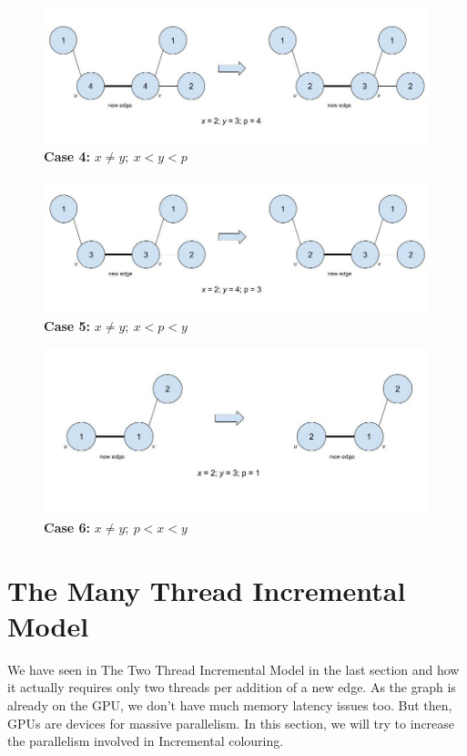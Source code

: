 \documentclass[MTech]{iitmdiss}
\begin{document}
\begin{figure}[h]
    \centering
    \includegraphics[width=\textwidth,keepaspectratio=true]{case4.jpg}
    \caption{
        \textbf{Case 4:} $x \neq y; \: x < y < p$
    }
    \label{fig:case4}
\end{figure}

\begin{figure}[h]
    \centering
    \includegraphics[width=\textwidth,keepaspectratio=true]{case5.jpg}
    \caption{
        \textbf{Case 5:} $x \neq y; \: x < p < y$
    }
    \label{fig:case5}
\end{figure}

\begin{figure}[h]
    \centering
    \includegraphics[width=\textwidth,keepaspectratio=true]{case6.jpg}
    \caption{
        \textbf{Case 6:} $x \neq y; \: p < x < y$ 
    }
    \label{fig:case6}
\end{figure}

\section{The Many Thread Incremental Model}
We have seen in The Two Thread Incremental Model in the last section and how it actually requires only two threads per addition of a new edge. As the graph is already on the GPU, we don't have much memory latency issues too. But then, GPUs are devices for massive parallelism. In this section, we will try to increase the parallelism involved in Incremental colouring.
\end{document}
